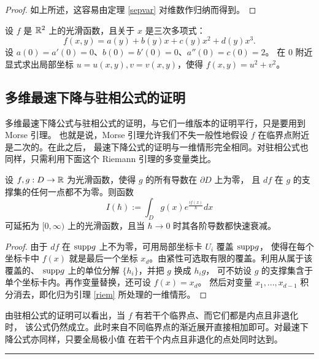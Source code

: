 \begin{proof} 如上所述，这容易由定理 \ref{sepvar} 对维数作归纳而得到。
\end{proof}

\begin{exercise} 设 $f$ 是 $\Bbb R^2$ 上的光滑函数，且关于 $x$ 是三次多项式：
$$
f(x,y)=a(y)+b(y)x+c(y)x^2+d(y)x^3.
$$
设 $a(0)=a'(0)=0$、$b(0)=b'(0)=0$、$a''(0)=c(0)=2$。
在 $0$ 附近显式求出局部坐标 $u=u(x,y),v=v(x,y)$，使得 $f(x,y)=u^2+v^2$。
\end{exercise} 

\subsection{多维最速下降与驻相公式的证明}
多维最速下降公式与驻相公式的证明，与它们一维版本的证明平行，只是要用到 Morse 引理。
也就是说，Morse 引理允许我们不失一般性地假设 $f$ 在临界点附近是二次的。在此之后，
最速下降公式的证明与一维情形完全相同。对驻相公式也同样，只需利用下面这个 Riemann 引理的多变量类比。

\begin{lemma}\label{mrl} 设 $f,g: D\to \Bbb R$ 为光滑函数，使得 $g$ 的所有导数在 $\partial D$ 上为零，
且 $df$ 在 $g$ 的支撑集的任何一点都不为零。则函数
$$
I(\hbar):=\int_{D} g(x)e^{\frac{if(x)}{\hbar}}dx
$$
可延拓为 $[0,\infty)$ 上的光滑函数，且当 $\hbar\to 0$ 时其各阶导数都快速衰减。
\end{lemma} 
 
\begin{proof} 由于 $df$ 在 ${\rm supp}g$ 上不为零，可用局部坐标卡 $U_i$ 覆盖 ${\rm supp}g$，
使得在每个坐标卡中 $f(x)$ 就是最后一个坐标 $x_d$。由紧性可选取有限的覆盖。利用从属于该覆盖的、
${\rm supp}g$ 上的单位分解 $\lbrace h_i\rbrace$，并把 $g$ 换成 $h_ig$，
可不妨设 $g$ 的支撑集含于单个坐标卡内。再作变量替换，还可设 $f(x)=x_d$。
然后对变量 $x_1,...,x_{d-1}$ 积分消去，即化归为引理 \ref{riem} 所处理的一维情形。
\end{proof} 

\begin{remark}\label{severa} 由驻相公式的证明可以看出，当 $f$ 有若干个临界点、而它们都是内点且非退化时，
该公式仍然成立。此时来自不同临界点的渐近展开直接相加即可。对最速下降公式亦同样，只要全局极小值
在若干个内点且非退化的点处同时达到。
\end{remark} 

\bigskip
\noindent\rule{\textwidth}{0.6pt}


